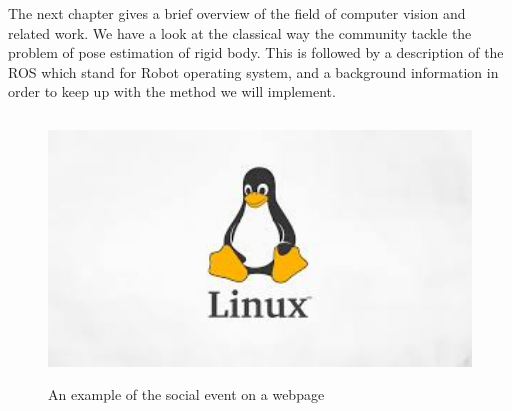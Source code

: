 The next chapter gives a brief overview of the field of computer vision and related work. We have a look at the classical way the community tackle the problem of pose estimation of rigid body. This is followed by a description of the ROS which stand for Robot operating system, and a background information in order to keep up with the method we will implement.



\begin{figure}[h]
\begin{center}
\includegraphics[height=7cm]{figures01/linux1.jpeg}
\caption{An example of the social event on a webpage}
\label{fig:webevent}
\end{center}
\end{figure}

